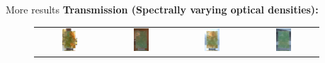 \documentclass[final]{beamer}
\newlength{\sepwid}
\newlength{\twocolwid}
\begin{document}
\begin{frame}[t]
\begin{columns}[t]
    \begin{column}{\sepwid}\end{column} %
    \begin{column}{\twocolwid} %
        \begin{block}{More results}
            \textbf{Transmission (Spectrally varying optical densities):}
            \vspace{-1cm}
            \begin{figure}
            	\begin{tabular}{cccc}
            		\includegraphics[width=0.24\textwidth]{images/results/zhaoyun_bg1_1.jpg} &
            		\includegraphics[width=0.24\textwidth]{images/results/zhaoyun_bg1_2.jpg} &
            		\includegraphics[width=0.24\textwidth]{images/results/zhaoyun_bg2_1.jpg} &
            		\includegraphics[width=0.24\textwidth]{images/results/zhaoyun_bg2_2.jpg}

\end{tabular}
\end{figure}
\end{block}
\end{column}
\end{columns}
\end{frame}
\end{document}
